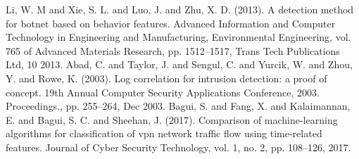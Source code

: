 \documentclass[conference]{IEEEtran}
\begin{document}
\begin{thebibliography}{00}
 Li, W. M and Xie, S. L. and Luo, J. and Zhu, X. D. (2013). A detection method for botnet based on behavior features. Advanced Information and Computer Technology in Engineering and Manufacturing, Environmental Engineering, vol. 765 of Advanced Materials Research, pp. 1512–1517, Trans Tech Publications Ltd, 10 2013.
 Abad, C. and Taylor, J. and Sengul, C.  and Yurcik, W. and Zhou, Y. and Rowe, K. (2003). Log correlation for intrusion detection: a proof of concept. 19th Annual Computer Security Applications Conference, 2003. Proceedings., pp. 255–264, Dec 2003.
 Bagui, S. and Fang, X. and Kalaimannan, E. and Bagui, S. C. and Sheehan, J. (2017). Comparison of machine-learning algorithms for classification of vpn network traffic flow using time-related features. Journal of Cyber Security Technology, vol. 1, no. 2, pp. 108–126, 2017.
\end{thebibliography}

\vspace{12pt}
\color{red}
\end{document}
